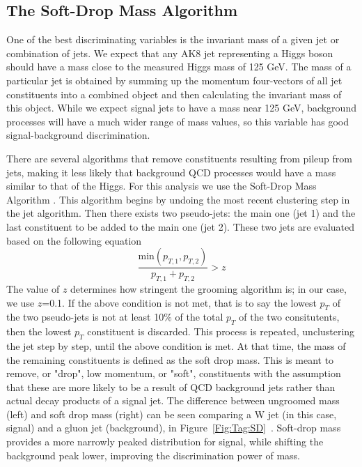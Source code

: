 \subsection{The Soft-Drop Mass Algorithm}
One of the best discriminating variables is the invariant mass of a given jet or combination of jets. We expect that any AK8 jet representing a Higgs boson should have a mass close to the measured Higgs mass of 125 GeV. The mass of a particular jet is obtained by summing up the momentum four-vectors of all jet constituents into a combined object and then calculating the invariant mass of this object. While we expect signal jets to have a mass near 125 GeV, background processes will have a much wider range of mass values, so this variable has good signal-background discrimination.

There are several algorithms that remove constituents resulting from pileup from jets, making it less likely that background QCD processes would have a mass similar to that of the Higgs. For this analysis we use the Soft-Drop Mass Algorithm \cite{Larkoski:2014wba}. This algorithm begins by undoing the most recent clustering step in the jet algorithm. Then there exists two pseudo-jets: the main one (jet 1) and the last constituent to be added to the main one (jet 2). These two jets are evaluated based on the following equation
\begin{equation}
   \frac{\textrm{min}(p_{T,1},p_{T,2})}{p_{T,1} + p_{T,2}} > z
\end{equation}
The value of $z$ determines how stringent the grooming algorithm is; in our case, we use $z$=0.1. If the above condition is not met, that is to say the lowest $p_{T}$ of the two pseudo-jets is not at least 10\% of the total $p_{T}$ of the two consitutents, then the lowest $p_{T}$ constituent is discarded. This process is repeated, unclustering the jet step by step, until the above condition is met. At that time, the mass of the remaining constituents is defined as the soft drop mass. This is meant to remove, or "drop", low momentum, or "soft", constituents with the assumption that these are more likely to be a result of QCD background jets rather than actual decay products of a signal jet. The difference between ungroomed mass (left) and soft drop mass (right) can be seen comparing a W jet (in this case, signal) and a gluon jet (background), in Figure~\ref{Fig:Tag:SD}~\cite{Adams:2015hiv}. Soft-drop mass provides a more narrowly peaked distribution for signal, while shifting the background peak lower, improving the discrimination power of mass.
